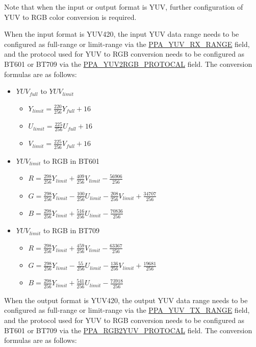 \documentclass[main\_\_EN.tex]{subfiles}
\begin{document}
Note that when the input or output format is YUV, further configuration of YUV to RGB color conversion is required.

When the input format is YUV420, the input YUV data range needs to be configured as full-range or limit-range via the \hyperref[fielddesc:PPAYUVRXRANGE]{PPA\_YUV\_RX\_RANGE} field, and the protocol used for YUV to RGB conversion needs to be configured as BT601 or BT709 via the \hyperref[fielddesc:PPAYUV2RGBPROTOCAL]{PPA\_YUV2RGB\_PROTOCAL} field. The conversion formulas are as follows:

\begin{itemize}
    \item $YUV_{full}$ to $YUV_{limit}$
        \begin{itemize}
            \item $Y_{limit} = \frac{220}{256} Y_{full} + 16$
            \item $U_{limit} = \frac{225}{256} U_{full} + 16$
            \item $V_{limit} = \frac{225}{256} V_{full} + 16$
        \end{itemize}
    \item $YUV_{limit}$ to RGB in BT601
        \begin{itemize}
            \item $R = \frac{298}{256}Y_{limit} + \frac{409}{256}V_{limit} - \frac{56906}{256}$
            \item $G = \frac{298}{256}Y_{limit} - \frac{100}{256}U_{limit} - \frac{208}{256}V_{limit} + \frac{34707}{256}$
            \item $B = \frac{298}{256}Y_{limit} + \frac{516}{256}U_{limit} -  \frac{70836}{256}$
        \end{itemize}
    \item $YUV_{limit}$ to RGB in BT709
        \begin{itemize}
            \item $R = \frac{298}{256}Y_{limit} + \frac{459}{256}V_{limit} - \frac{63367}{256}$
            \item $G = \frac{298}{256}Y_{limit} - \frac{55}{256}U_{limit} - \frac{136}{256}V_{limit} + \frac{19681}{256}$
            \item $B = \frac{298}{256}Y_{limit} + \frac{541}{256}U_{limit} -  \frac{73918}{256}$
        \end{itemize}
\end{itemize}

When the output format is YUV420, the output YUV data range needs to be configured as full-range or limit-range via the \hyperref[fielddesc:PPAYUVTXRANGE]{PPA\_YUV\_TX\_RANGE} field, and the protocol used for YUV to RGB conversion needs to be configured as BT601 or BT709 via the \hyperref[fielddesc:PPARGB2YUVPROTOCAL]{PPA\_RGB2YUV\_PROTOCAL} field. The conversion formulas are as follows:
\end{document}
